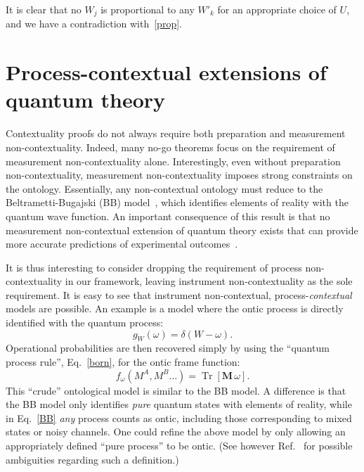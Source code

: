 \documentclass[a4paper,onecolumn,11pt,accepted=2018-05-04]{quantumarticle}
\DeclareMathOperator{\tr}{Tr}
\begin{document}
It is clear that no $W_j $ is proportional to any $W'_k$ for an appropriate choice of $U$, and we have a contradiction with~\eqref{prop}.

\section{Process-contextual extensions of quantum theory}\label{extension}

Contextuality proofs do not always require both preparation and measurement non-contextuality. Indeed, many no-go theorems focus on the requirement of measurement non-contextuality alone. Interestingly, even without preparation non-contextuality, measurement non-contextuality imposes strong constraints on the ontology. Essentially, any non-contextual ontology must reduce to the Beltrametti-Bugajski (BB) model~\cite{beltrametti95}, which identifies elements of reality with the quantum wave function. An important consequence of this result is that no measurement non-contextual extension of quantum theory exists that can provide more accurate predictions of experimental outcomes~\cite{Montina2011}.

It is thus interesting to consider dropping the requirement of process non-contextuality in our framework, leaving instrument non-contextuality as the sole requirement.  It is easy to see that instrument non-contextual, process-\emph{contextual} models are possible. An example is a model where the ontic process is directly identified with the quantum process:
\begin{equation}
g_W\left(\omega\right) =\delta\left(W-\omega\right).
\label{BB}
\end{equation}
Operational probabilities are then recovered simply by using the ``quantum process rule'', Eq.~\eqref{born}, for the ontic frame function:
\begin{equation}
f_{\omega}(M^A, M^B\dots) = \tr \left[\mathbf{M}\, \omega\right].
\end{equation}
This ``crude'' ontological model is similar to the BB model. A difference is that the BB model only identifies \emph{pure} quantum states with elements of reality, while in Eq.~\eqref{BB} \emph{any} process counts as ontic, including those corresponding to mixed states or noisy channels. One could refine the above model by only allowing an appropriately defined ``pure process'' to be ontic. (See however Ref.~\cite{Araujo2017purification} for possible ambiguities regarding such a definition.)
\end{document}

